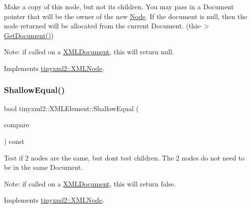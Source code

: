 Make a copy of this node, but not its children. You may pass in a Document pointer that will be the owner of the new \hyperlink{classNode}{Node}. If the \textquotesingle{}document\textquotesingle{} is null, then the node returned will be allocated from the current Document. (this-\/$>$\hyperlink{classtinyxml2_1_1XMLNode_af343d1ef0b45c0020e62d784d7e67a68}{Get\+Document()})

Note\+: if called on a \hyperlink{classtinyxml2_1_1XMLDocument}{X\+M\+L\+Document}, this will return null. 

Implements \hyperlink{classtinyxml2_1_1XMLNode_a8402cbd3129d20e9e6024bbcc0531283}{tinyxml2\+::\+X\+M\+L\+Node}.

\mbox{\label{classtinyxml2_1_1XMLElement_a61ffd7bf918a9db4aa6203d855ac5ec2}} 
\subsubsection{\texorpdfstring{Shallow\+Equal()}{ShallowEqual()}\hspace{0.1cm}{\footnotesize\ttfamily [1/2]}}
{\footnotesize\ttfamily bool tinyxml2\+::\+X\+M\+L\+Element\+::\+Shallow\+Equal (\begin{DoxyParamCaption}\item[{const \hyperlink{classtinyxml2_1_1XMLNode}{X\+M\+L\+Node} $\ast$}]{compare }\end{DoxyParamCaption}) const\hspace{0.3cm}{\ttfamily [virtual]}}

Test if 2 nodes are the same, but don\textquotesingle{}t test children. The 2 nodes do not need to be in the same Document.

Note\+: if called on a \hyperlink{classtinyxml2_1_1XMLDocument}{X\+M\+L\+Document}, this will return false. 

Implements \hyperlink{classtinyxml2_1_1XMLNode_a7ce18b751c3ea09eac292dca264f9226}{tinyxml2\+::\+X\+M\+L\+Node}.

\mbox{\label{classtinyxml2_1_1XMLElement_ad9ea913a460b48979bd83cf9871c99f6}} 
